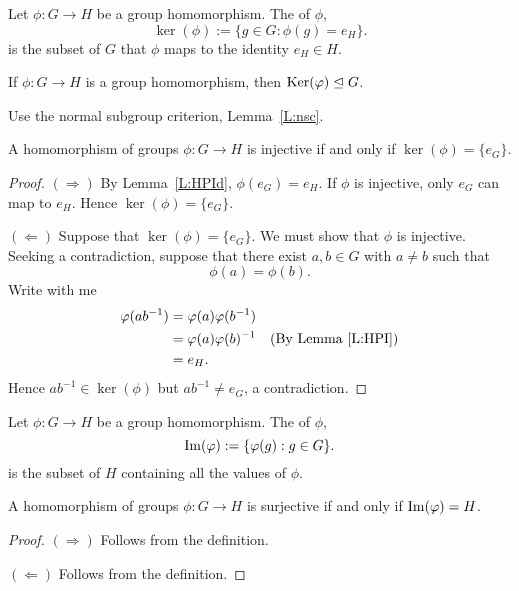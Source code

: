 \documentclass{ximera}
\begin{document}
\begin{definition}
  Let $\phi:G\to H$ be a group homomorphism. The  of
  $\phi$,
  \[
  \ker(\phi) := \{g\in G: \phi(g) = e_H\}.
  \]
  is the subset of $G$ that $\phi$ maps to the identity $e_H\in H$.
\end{definition}





\begin{lemma}\label{L:kerN}
  If $\phi:G\to H$ is a group homomorphism, then $\ker(\phi)\normal G$.
  \begin{sketch}
    Use the normal subgroup criterion, Lemma~\ref{L:nsc}.
  \end{sketch}
\end{lemma}



\begin{lemma}\label{L:kerinj}
  A homomorphism of groups $\phi:G\to H$ is injective if and only if
  $\ker(\phi) = \{e_G\}$.
  \begin{proof}
    $(\Rightarrow)$ By Lemma~\ref{L:HPId}, $\phi(e_G) = e_H$. If
    $\phi$ is injective, only $e_G$ can map to $e_H$. Hence
    $\ker(\phi) = \{e_G\}$.


    $(\Leftarrow)$ Suppose that $\ker(\phi) = \{e_G\}$. We must show
    that $\phi$ is injective. Seeking a contradiction, suppose that
    there exist $a,b\in G$ with $a\ne b$ such that
    \[
    \phi(a) = \phi(b).
    \]
    Write with me
    \begin{align*}
      \phi(ab^{-1}) &=\phi(a)\phi(b^{-1})\\
      &= \phi(a) \phi(b)^{-1} & \text{(By Lemma~\ref{L:HPI})}\\
      &= e_H.
    \end{align*}
    Hence $ab^{-1}\in\ker(\phi)$ but $ab^{-1}\ne e_G$, a
    contradiction.
  \end{proof}
\end{lemma}


\begin{definition}
  Let $\phi:G\to H$ be a group homomorphism. The  of
  $\phi$,
  \[
  \im(\phi) := \{\phi(g): g\in G\}.
  \]
  is the subset of $H$ containing all the values of $\phi$.
\end{definition}



\begin{lemma}
    A homomorphism of groups $\phi:G\to H$ is surjective if and only
    if $\im(\phi) = H$.
    \begin{proof}
      $(\Rightarrow)$ Follows from the definition.

      $(\Leftarrow)$ Follows from the definition.
    \end{proof}
\end{lemma}
\end{document}
